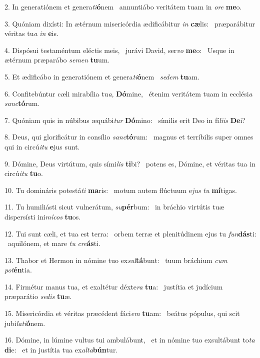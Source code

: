 2. In generatiónem et genera\textit{ti}\textbf{ó}nem \ast\  annuntiábo veritátem tuam in \textit{o}\textit{re} \textbf{me}o.\

3. Quóniam dixísti: In ætérnum misericórdia ædificábitur \textit{in} \textbf{cæ}lis: \ast\  præparábitur véritas tu\textit{a} \textit{in} \textbf{e}is.\

4. Dispósui testaméntum eléctis meis, \dag\  jurávi David, ser\textit{vo} \textbf{me}o: \ast\  Usque in ætérnum præparábo \textit{se}\textit{men} \textbf{tu}um.\

5. Et ædificábo in generatiónem et genera\textit{ti}\textbf{ó}nem \ast\  \textit{se}\textit{dem} \textbf{tu}am.\

6. Confitebúntur cæli mirabília tu\textit{a}, \textbf{Dó}mine, \ast\  étenim veritátem tuam in ecclési\textit{a} \textit{sanc}\textbf{tó}rum.\

7. Quóniam quis in núbibus æquábi\textit{tur} \textbf{Dó}mino: \ast\  símilis erit Deo in fí\textit{li}\textit{is} \textbf{De}i?\

8. Deus, qui glorificátur in consílio \textit{sanc}\textbf{tó}rum: \ast\  magnus et terríbilis super omnes qui in circú\textit{i}\textit{tu} \textbf{e}jus sunt.\

9. Dómine, Deus virtútum, quis sími\textit{lis} \textbf{ti}bi? \ast\  potens es, Dómine, et véritas tua in circú\textit{i}\textit{tu} \textbf{tu}o.\

10. Tu domináris potestá\textit{ti} \textbf{ma}ris: \ast\  motum autem flúctuum e\textit{jus} \textit{tu} \textbf{mí}tigas.\

11. Tu humiliásti sicut vulnerátum, \textit{su}\textbf{pér}bum: \ast\  in bráchio virtútis tuæ dispersísti ini\textit{mí}\textit{cos} \textbf{tu}os.\

12. Tui sunt cæli, et tua est terra: \dag\  orbem terræ et plenitúdinem ejus tu \textit{fun}\textbf{dás}ti: \ast\  aquilónem, et mare \textit{tu} \textit{cre}\textbf{ás}ti.\

13. Thabor et Hermon in nómine tuo ex\textit{sul}\textbf{tá}bunt: \ast\  tuum bráchium \textit{cum} \textit{pot}\textbf{én}tia.\

14. Firmétur manus tua, et exaltétur déxte\textit{ra} \textbf{tu}a: \ast\  justítia et judícium præparátio \textit{se}\textit{dis} \textbf{tu}æ.\

15. Misericórdia et véritas præcédent fáci\textit{em} \textbf{tu}am: \ast\  beátus pópulus, qui scit jubi\textit{la}\textit{ti}\textbf{ó}nem.\

16. Dómine, in lúmine vultus tui ambulábunt, \dag\  et in nómine tuo exsultábunt to\textit{ta} \textbf{di}e: \ast\  et in justítia tua ex\textit{al}\textit{ta}\textbf{bún}tur.\

